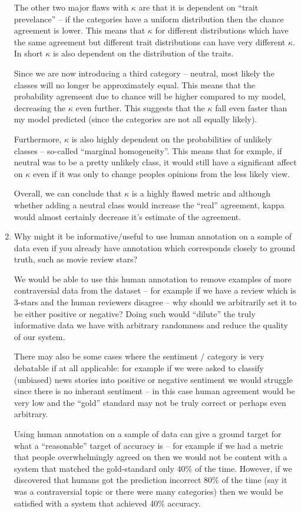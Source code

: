 \documentclass[10pt,\jkfside,a4paper]{article}
\begin{document}
\begin{enumerate}
The other two major flaws with $\kappa$ are that it is dependent on ``trait prevelance'' -- 
if the categories have a uniform distribution then the chance agreement is lower. This 
means that $\kappa$ for different distributions which have the same agreement but different 
trait distributions can have very different $\kappa$. In short $\kappa$ is also dependent on 
the distribution of the traits.

Since we are now introducing a third category -- neutral, most likely the classes will no longer 
be approximately equal. This means that the probability agremeent due to chance will be higher 
compared to my model, decreasing the $\kappa$ even further. This suggests that the $\kappa$ 
fall even faster than my model predicted (since the categories are not all equally likely).

Furthermore, $\kappa$ is also highly dependent on the probabilities of unlikely classes -- 
so-called ``marginal homogeneity''. This means that for exmple, if neutral was to be a pretty 
unlikely class, it would still have a significant affect on $\kappa$ even if it was only to 
change peoples opinions from the less likely view.

Overall, we can conclude that $\kappa$ is a highly flawed metric and although whether 
adding a neutral class would increase the ``real'' agreement, kappa would almost certainly 
decrease it's estimate of the agreement.

\item Why might it be informative/useful to use human annotation on a sample
of data even if you already have annotation which corresponds closely to
ground truth, such as movie review stars?

We would be able to use this human annotation to remove examples of more contraversial data from the 
dataset -- for example if we have a review which is 3-stars and the human reviewers disagree -- why 
should we arbitrarily set it to be either positive or negative? Doing such would ``dilute'' the truly 
informative data we have with arbitrary randomness and reduce the quality of our system.

There may also be some cases where the sentiment / category is very debatable if at all applicable: 
for example if 
we were asked to classify (unbiased) news stories into positive or negative sentiment we would 
struggle since there is no inherant sentiment -- in this case human agreement would be very 
low and the ``gold'' standard may not be truly correct or perhaps even arbitrary.

Using human annotation on a sample of data can give a ground target for what a ``reasonable'' 
target of accuracy is -- for example if we had a metric that people overwhelmingly agreed on 
then we would not be content with a system that matched the gold-standard only 40\% of the time. 
However, if we discovered that humans got the prediction incorrect 80\% of the time (say it was a 
contraversial topic or there were many categories) then we would be satisfied with a system 
that achieved 40\% accuracy.

\end{enumerate}
\end{document}
